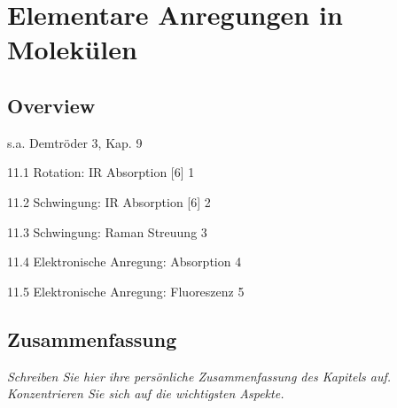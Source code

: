 \renewcommand{\lastmod}{10. September 2024}
\renewcommand{\chapterauthors}{Markus Lippitz}

\chapter{Elementare Anregungen in Molekülen}






\section{Overview}

s.a. Demtröder 3, Kap. 9


11.1 Rotation: IR Absorption [6] 1	

11.2 Schwingung: IR Absorption [6] 2	 

11.3 Schwingung: Raman Streuung 3	 

11.4 Elektronische Anregung: Absorption 4	 

11.5 Elektronische Anregung: Fluoreszenz 5	 



\section{Zusammenfassung}

\textit{Schreiben Sie hier ihre persönliche Zusammenfassung des Kapitels auf. Konzentrieren Sie sich auf die wichtigsten Aspekte.}

\vspace*{10cm}


\printbibliography[segment=\therefsegment,heading=subbibliography]
